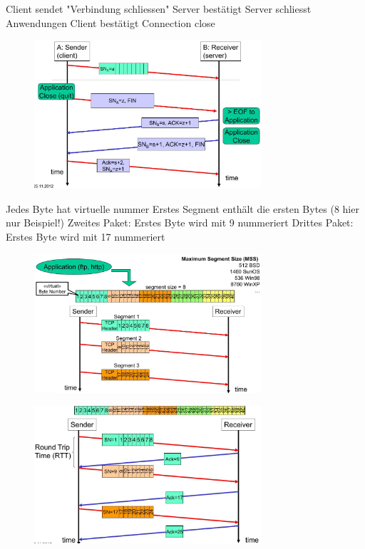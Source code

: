 \documentclass[ngerman,a4paper,12pt]{scrreprt}
\begin{document}
\ol
	\li Client sendet "Verbindung schliessen"
	\li Server bestätigt
	\li Server schliesst Anwendungen
	\li Client bestätigt Connection close
\olE
\begin{figure}[H]
	\centering
	\includegraphics[width=0.75\textwidth]{img/V11.13.jpg}
	\caption{}
	\label{}
\end{figure}

\ul
	\li Jedes Byte hat virtuelle nummer
	\li Erstes Segment enthält die ersten Bytes (8 hier nur Beispiel!)
	\li Zweites Paket: Erstes Byte wird mit 9 nummeriert
	\li Drittes Paket: Erstes Byte wird mit 17 nummeriert
\ulE
\begin{figure}[H]
	\centering
	\includegraphics[width=0.75\textwidth]{img/V11.14.jpg}
	\caption{}
	\label{}
\end{figure}

\begin{figure}[H]
	\centering
	\includegraphics[width=0.75\textwidth]{img/V11.15.jpg}
	\caption{}
	\label{}
\end{figure}
\end{document}
